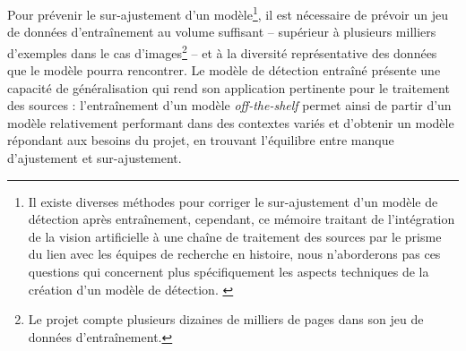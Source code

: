 	Pour prévenir le sur-ajustement d'un modèle\footnote{Il existe diverses méthodes pour corriger le sur-ajustement d'un modèle de détection après entraînement, cependant, ce mémoire traitant de l'intégration de la vision artificielle à une chaîne de traitement des sources par le prisme du lien avec les équipes de recherche en histoire, nous n'aborderons pas ces questions qui concernent plus spécifiquement les aspects techniques de la création d'un modèle de détection. \cite{carremansHandlingOverfittingDeep2019}}, il est nécessaire de prévoir un jeu de données d'entraînement au volume suffisant -- supérieur à plusieurs milliers d'exemples dans le cas d'images\footnote{Le projet \eida compte plusieurs dizaines de milliers de pages dans son jeu de données d'entraînement.} -- et à la diversité représentative des données que le modèle pourra rencontrer. Le modèle de détection entraîné présente une capacité de généralisation qui rend son application pertinente pour le traitement des sources : l'entraînement d'un modèle \textit{off-the-shelf} permet ainsi de partir d'un modèle relativement performant dans des contextes variés et d'obtenir un modèle répondant aux besoins du projet, en trouvant l'équilibre entre manque d'ajustement et sur-ajustement.